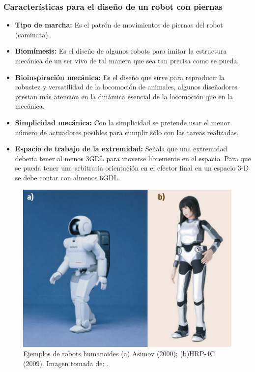 			\subsubsection*{Características para el diseño de un robot con piernas}
\begin{itemize}
\item \textbf{Tipo de marcha:} Es el patrón de movimientos de piernas del robot (caminata).

\item \textbf{Biomímesis:} Es el diseño de algunos robots para imitar la estructura mecánica de un ser vivo de tal manera que sea tan precisa como se pueda.

\item \textbf{Bioinspiración mecánica:} Es el diseño que sirve para reproducir la robustez y versatilidad de la locomoción de animales, algunos diseñadores prestan más atención en la dinámica esencial de la locomoción que en la mecánica.

\item \textbf{Simplicidad mecánica:} Con la simplicidad se pretende usar el menor número de actuadores posibles para cumplir sólo con las tareas realizadas.

\item \textbf{Espacio de trabajo de la extremidad: } Señala que una extremidad debería tener al menos 3GDL para moverse libremente en el espacio. Para que se pueda tener una arbitraria orientación en el efector final en un espacio 3-D se debe contar con almenos 6GDL.

\end{itemize}

\begin{figure}
	\centering		
	\includegraphics[scale=0.5]{images/asimov_and_HRP-4C.png}
	\caption{Ejemplos de robots humanoides (a) Asimov (2000); (b)HRP-4C (2009). Imagen tomada de: \cite{siciliano2016springer}.}		
\label{fig:humanoids}%
\end{figure}


